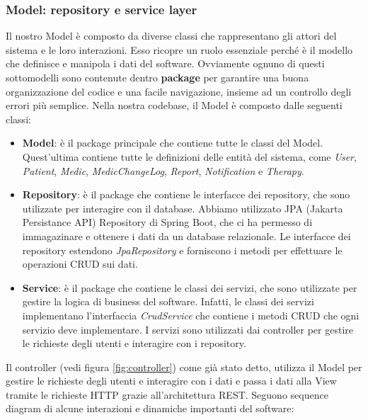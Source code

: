 \documentclass[a4paper]{article}
\begin{document}
\subsubsection{Model: repository e service layer}

Il nostro Model è composto da diverse classi che rappresentano gli attori del sistema e le loro interazioni.
Esso ricopre un ruolo essenziale perché è il modello che definisce e manipola i dati del software. 
Ovviamente ognuno di questi sottomodelli sono contenute dentro \textbf{package} per garantire una buona organizzazione del codice e una facile navigazione, insieme
ad un controllo degli errori più semplice.
Nella nostra codebase, il Model è composto dalle seguenti classi:
\begin{itemize}
  \item \textbf{Model}: è il package principale che contiene tutte le classi del Model. Quest'ultima contiene
  tutte le definizioni delle entità del sistema, come \textit{User}, \textit{Patient}, \textit{Medic}, \textit{MedicChangeLog}, \textit{Report}, \textit{Notification} e \textit{Therapy}.
  \item \textbf{Repository}: è il package che contiene le interfacce dei repository, che sono utilizzate per interagire con il database. 
  Abbiamo utilizzato JPA (Jakarta Persistance API) Repository di Spring Boot, che ci ha permesso di immagazinare e ottenere i dati da un 
  database relazionale. 
  Le interfacce dei repository estendono \textit{JpaRepository} e forniscono i metodi per effettuare le operazioni CRUD sui dati.
  \item \textbf{Service}: è il package che contiene le classi dei servizi, che sono utilizzate per gestire la logica di business del software. 
  Infatti, le classi dei servizi implementano l'interfaccia \textit{CrudService} che contiene i metodi CRUD che ogni servizio deve implementare.
  I servizi sono utilizzati dai controller per gestire le richieste degli utenti e interagire con i repository.
\end{itemize}
Il controller (vedi figura \ref{fig:controller}) come già stato detto, utilizza il Model per 
gestire le richieste degli utenti e interagire con i dati e
passa i dati alla View tramite le richieste HTTP grazie all'architettura REST.
Seguono sequence diagram di alcune interazioni e dinamiche importanti del software:
\end{document}
